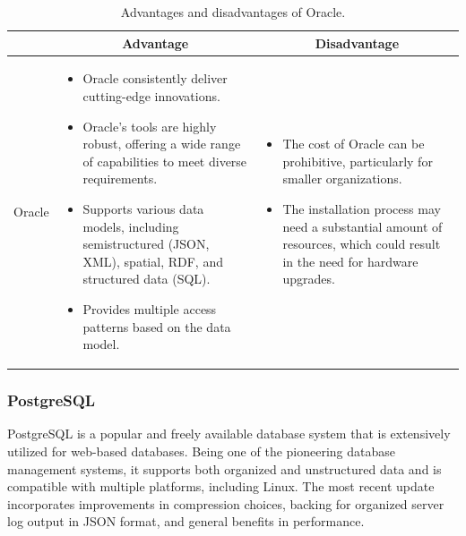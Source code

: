 \begin{table}[H]
    \centering
    \begin{tabular}{| c | p{} | p{} |}
        \hline
        \multicolumn{1}{|c|}{}
        & \multicolumn{1}{c|}{Advantage}
        & \multicolumn{1}{c|}{Disadvantage} \\ \hline
        \multirow{7}{*}{Oracle}     
                &   \begin{itemize}[leftmargin=*,topsep=0pt,partopsep=0pt,parsep=0pt]
                        \item Oracle consistently deliver cutting-edge innovations.
                        \item Oracle's tools are highly robust, offering a wide range of capabilities to meet diverse requirements.
                        \item Supports various data models, including semistructured (JSON, XML), spatial, RDF, and structured data (SQL).
                        \item Provides multiple access patterns based on the data model.
                    \end{itemize}
                &   \begin{itemize}[leftmargin=*,topsep=0pt,partopsep=0pt,parsep=0pt]
                        \item The cost of Oracle can be prohibitive, particularly for smaller organizations.
                        \item The installation process may need a substantial amount of resources, which could result in the need for hardware upgrades.
                    \end{itemize} \\ \hline
    \end{tabular}
    \caption{Advantages and disadvantages of Oracle.}
\end{table}

\subsubsection{PostgreSQL}

PostgreSQL is a popular and freely available database system that is extensively utilized for web-based databases. Being one of the pioneering database management systems, it supports both organized and unstructured data and is compatible with multiple platforms, including Linux. The most recent update incorporates improvements in compression choices, backing for organized server log output in JSON format, and general benefits in performance.

